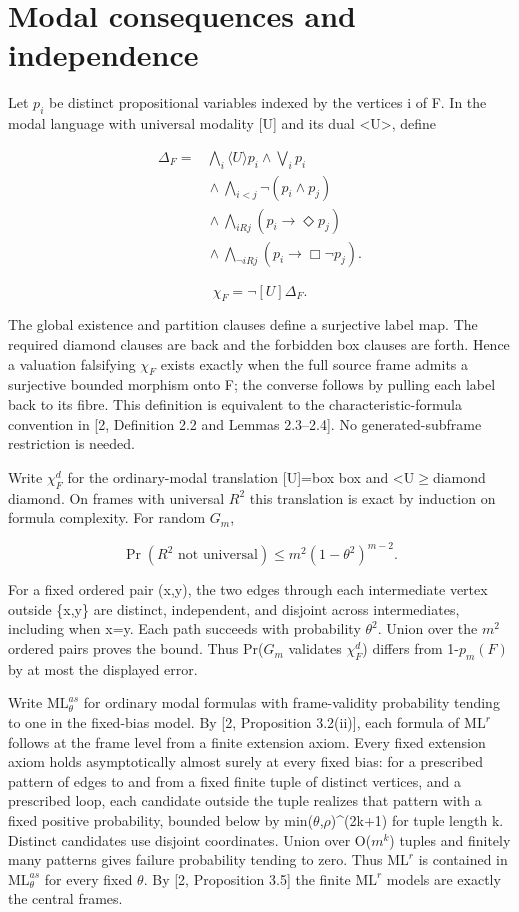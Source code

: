 \documentclass[11pt]{article}
\begin{document}
\section{Modal consequences and independence}

Let $p_{i}$ be distinct propositional variables indexed by the vertices i of F. In the modal language with universal modality [U] and its dual <U>, define

\[
\begin{aligned}\Delta_F={}&\bigwedge_i\langle U\rangle p_i\land\bigvee_i p_i\\
&{}\land\bigwedge_{i<j}\neg(p_i\land p_j)\\
&{}\land\bigwedge_{iRj}(p_i\to\Diamond p_j)\\
&{}\land\bigwedge_{\neg iRj}(p_i\to\Box\neg p_j).
\end{aligned}
\]

\[
\chi_F=\neg[U]\Delta_F.
\]

The global existence and partition clauses define a surjective label map. The required diamond clauses are back and the forbidden box clauses are forth. Hence a valuation falsifying $\chi_{F}$ exists exactly when the full source frame admits a surjective bounded morphism onto F; the converse follows by pulling each label back to its fibre. This definition is equivalent to the characteristic-formula convention in [2, Definition 2.2 and Lemmas 2.3--2.4]. No generated-subframe restriction is needed.

Write $\chi_{F}^{d}$ for the ordinary-modal translation [U]=box box and <U\ensuremath{\geq}diamond diamond. On frames with universal $R^{2}$ this translation is exact by induction on formula complexity. For random $G_{m}$,

\[
\Pr(R^2\text{ not universal})\leq m^2(1-\theta^2)^{m-2}.
\]

For a fixed ordered pair (x,y), the two edges through each intermediate vertex outside \{x,y\} are distinct, independent, and disjoint across intermediates, including when x=y. Each path succeeds with probability $\theta^{2}$. Union over the $m^{2}$ ordered pairs proves the bound. Thus Pr($G_{m}$ validates $\chi_{F}^{d}$) differs from 1-$p_m(F)$ by at most the displayed error.

Write $\mathrm{ML}^{as}_\theta$ for ordinary modal formulas with frame-validity probability tending to one in the fixed-bias model. By [2, Proposition 3.2(ii)], each formula of $\mathrm{ML}^r$ follows at the frame level from a finite extension axiom. Every fixed extension axiom holds asymptotically almost surely at every fixed bias: for a prescribed pattern of edges to and from a fixed finite tuple of distinct vertices, and a prescribed loop, each candidate outside the tuple realizes that pattern with a fixed positive probability, bounded below by min($\theta$,$\rho$)\textasciicircum{}(2k+1) for tuple length k. Distinct candidates use disjoint coordinates. Union over O($m^{k}$) tuples and finitely many patterns gives failure probability tending to zero. Thus $\mathrm{ML}^r$ is contained in $\mathrm{ML}^{as}_\theta$ for every fixed $\theta$. By [2, Proposition 3.5] the finite $\mathrm{ML}^r$ models are exactly the central frames.
\end{document}
